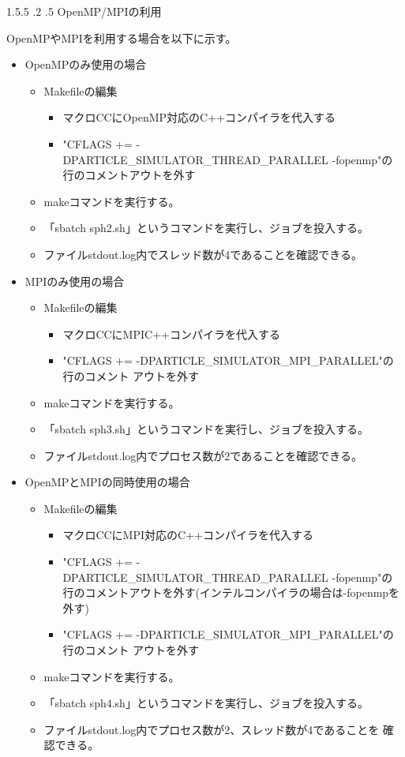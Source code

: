 \documentclass[12pt,a4paper]{jarticle}
\makeatletter
\newcommand{\subsubsubsection}{\@startsection{paragraph}{4}{\z@}%
{1.5\baselineskip \@plus.5\dp0 \@minus.2\dp0}%
{.5\baselineskip \@plus2.3\dp0}%
{\reset@font\normalsize\bfseries}
}
\makeatother
\begin{document}
\subsubsubsection{OpenMP/MPIの利用}

OpenMPやMPIを利用する場合を以下に示す。
\begin{itemize}
\item OpenMPのみ使用の場合
  \begin{itemize}
  \item Makefileの編集
    \begin{itemize}
    \item マクロCCにOpenMP対応のC++コンパイラを代入する
    \item "CFLAGS += -DPARTICLE\_SIMULATOR\_THREAD\_PARALLEL -fopenmp"の
      行のコメントアウトを外す
    \end{itemize}
  \item makeコマンドを実行する。
  \item 「sbatch sph2.sh」というコマンドを実行し、ジョブを投入する。
  \item ファイルstdout.log内でスレッド数が4であることを確認できる。
  \end{itemize}

\item MPIのみ使用の場合
  \begin{itemize}
  \item Makefileの編集
    \begin{itemize}
    \item マクロCCにMPIC++コンパイラを代入する
    \item "CFLAGS += -DPARTICLE\_SIMULATOR\_MPI\_PARALLEL"の行のコメント
      アウトを外す
    \end{itemize}
  \item makeコマンドを実行する。
  \item 「sbatch sph3.sh」というコマンドを実行し、ジョブを投入する。
  \item ファイルstdout.log内でプロセス数が2であることを確認できる。
  \end{itemize}

\item OpenMPとMPIの同時使用の場合
  \begin{itemize}
  \item Makefileの編集
    \begin{itemize}
    \item マクロCCにMPI対応のC++コンパイラを代入する
    \item "CFLAGS += -DPARTICLE\_SIMULATOR\_THREAD\_PARALLEL -fopenmp"の
      行のコメントアウトを外す(インテルコンパイラの場合は-fopenmpを外す)
    \item "CFLAGS += -DPARTICLE\_SIMULATOR\_MPI\_PARALLEL"の行のコメント
      アウトを外す
    \end{itemize}
  \item makeコマンドを実行する。
  \item 「sbatch sph4.sh」というコマンドを実行し、ジョブを投入する。
  \item ファイルstdout.log内でプロセス数が2、スレッド数が4であることを
    確認できる。
  \end{itemize}

\end{itemize}
\end{document}
